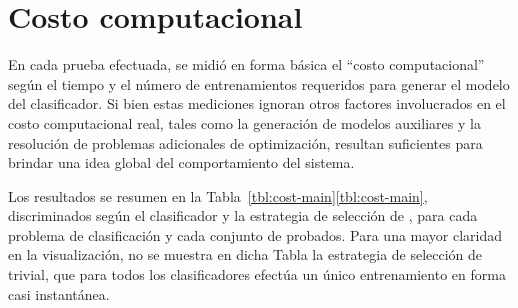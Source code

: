%
%
\section{Costo computacional}
%
En cada prueba efectuada, se midió en forma básica el ``costo
computacional'' según el tiempo y el número de entrenamientos
requeridos para generar el modelo del clasificador.
Si bien estas mediciones ignoran otros factores involucrados en el
costo computacional real, tales como la generación de modelos
auxiliares y la resolución de problemas adicionales de optimización,
resultan suficientes para brindar una idea global del comportamiento
del sistema.

Los resultados se resumen en la
\iflatexml{}Tabla~\ref{tbl:cost-main}\else\autoref{tbl:cost-main}\fi{},
discriminados según el clasificador y la estrategia de selección de
, para cada problema de clasificación y cada conjunto de
 probados.
Para una mayor claridad en la visualización, no se muestra en dicha
Tabla la estrategia de selección de  trivial, que para todos
los clasificadores efectúa un único entrenamiento en forma casi
instantánea.
